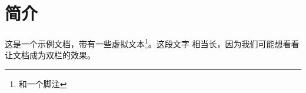 \documentclass[chapterprefix]{scrreprt}
\begin{document}
\chapter{简介}

这是一个示例文档，带有一些虚拟文本\footnote{和一个脚注}。这段文字
相当长，因为我们可能想看看让文档成为双栏的效果。
\end{document}
